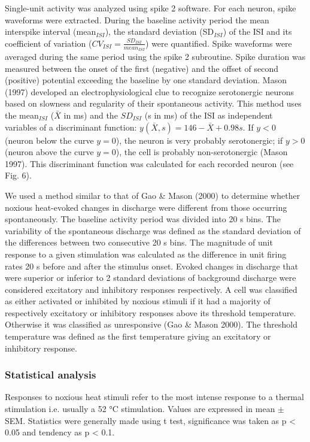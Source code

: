 \documentclass[a4paper,12pt,twoside]{report}
\begin{document}
Single-unit activity was analyzed using spike 2 software. For each neuron, spike waveforms were extracted. During the baseline activity period the mean interspike interval (mean$_{ISI}$), the standard deviation (SD$_{ISI}$) of the ISI and its coefficient of variation ($CV_{ISI} = \frac{SD_{ISI}}{mean_{ISI}}$) were quantified. Spike waveforms were averaged during the same period using the spike 2 subroutine. Spike duration was measured between the onset of the first (negative) and the offset of second (positive) potential exceeding the baseline by one standard deviation. Mason (1997) developed an electrophysiological clue to recognize serotonergic neurons based on slowness and regularity of their spontaneous activity. This method uses the mean$_{ISI}$ ($\bar{X}$ in ms) and the $SD_{ISI}$ (s in ms) of the ISI as independent variables of a discriminant function: $y(\bar{X},s)=146-\bar{X}+0.98s$. If $y<0$ (neuron below the curve $y=0$), the neuron is very probably serotonergic; if $y>0$ (neuron above the curve $y=0$), the cell is probably non-serotonergic (Mason 1997). This discriminant function was calculated for each recorded neuron (see Fig. 6).

We used a method similar to that of Gao \& Mason (2000) to determine whether noxious heat-evoked changes in discharge were different from those occurring spontaneously. The baseline activity period was divided into 20 s bins. The variability of the spontaneous discharge was defined as the standard deviation of the differences between two consecutive 20 s bins. The magnitude of unit response to a given stimulation was calculated as the difference in unit firing rates 20 s before and after the stimulus onset. Evoked changes in discharge that were superior or inferior to 2 standard deviations of background discharge were considered excitatory and inhibitory responses respectively. A cell was classified as either activated or inhibited by noxious stimuli if it had a majority of respectively excitatory or inhibitory responses above its threshold temperature. Otherwise it was classified as unresponsive (Gao \& Mason 2000). The threshold temperature was defined as the first temperature giving an excitatory or inhibitory response.

\subsubsection{Statistical analysis}

Responses to noxious heat stimuli refer to the most intense response to a thermal stimulation i.e. usually a 52 °C stimulation. Values are expressed in mean $\pm$ SEM. Statistics were generally made using t test, significance was taken as p < 0.05 and tendency as p < 0.1.
\end{document}
